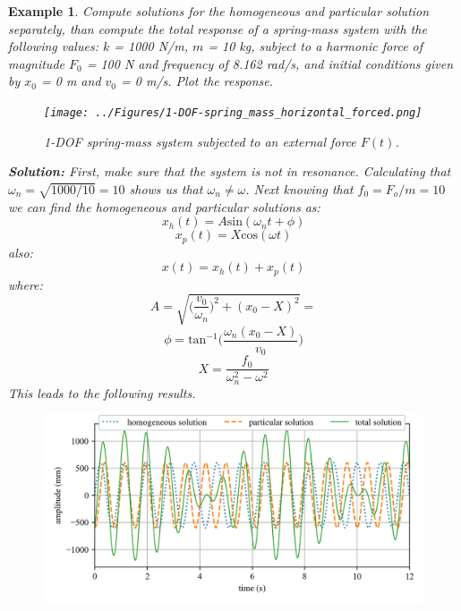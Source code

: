 \documentclass[12pt,letter]{article}
\newtheorem{ex}{Example}
\numberwithin{ex}{section} %
\newenvironment{example}{\begin{mdframed}[middlelinewidth=0.5mm]\begin{ex}\normalfont}{\end{ex}\end{mdframed}}
\numberwithin{re}{section} %
\begin{document}
\begin{example}

			Compute solutions for the homogeneous and particular solution separately, than compute the total response of a spring-mass system with the following values: $k$ = 1000 N/m, $m$ = 10 kg, subject to a harmonic force of magnitude $F_0$ = 100 N and frequency of 8.162 rad/s, and initial conditions given by $x_0$ = 0 m and $v_0$ = 0 m/s. Plot the response.
			
			\begin{figure}[H]
				\centering
				\texttt{[image: ../Figures/1-DOF-spring\_mass\_horizontal\_forced.png]}
				\caption{1-DOF spring-mass system subjected to an external force $F(t)$.}
			\end{figure}
			
			\noindent\textbf{Solution:} First, make sure that the system is not in resonance. Calculating that $\omega_n = \sqrt{1000/10} = 10$ shows us that $\omega_n \neq \omega$. Next knowing that $f_0 = F_o/m = 10$ we can find the homogeneous and particular solutions as:
			\begin{equation}
				x_h(t) = A\text{sin}(\omega_n t + \phi)
			\end{equation}				
			\begin{equation}
				x_p(t) = X\text{cos}(\omega t) 
			\end{equation}	
			also:			
			\begin{equation}
				x(t) = x_h(t) + x_p(t)
			\end{equation}	
			where:			
			\begin{equation}
				A = \sqrt{\bigg(\frac{v_0}{\omega_n}\bigg)^2+(x_0-X)^2} = 
			\end{equation}				
			\begin{equation}
				\phi = \text{tan}^{-1}\bigg(\frac{\omega_n(x_0-X)}{v_0}\bigg)
			\end{equation}				
			\begin{equation}
				X = \frac{f_0}{\omega_n^2-\omega^2}
			\end{equation}			
			This leads to the following results. 
			\begin{figure}[H]
				\centering
				\includegraphics[]{../Figures/homogeneous_and_particular_solutions.png}
			\end{figure}			

\end{example}
\end{document}
